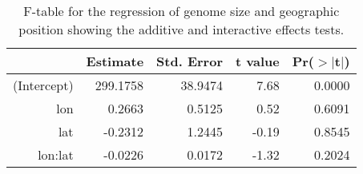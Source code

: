 \begin{table}[ht]
\centering
\begin{tabular}{rrrrr}
  \hline
 & Estimate & Std. Error & t value & Pr($>$$|$t$|$) \\ 
  \hline
(Intercept) & 299.1758 & 38.9474 & 7.68 & 0.0000 \\ 
  lon & 0.2663 & 0.5125 & 0.52 & 0.6091 \\ 
  lat & -0.2312 & 1.2445 & -0.19 & 0.8545 \\ 
  lon:lat & -0.0226 & 0.0172 & -1.32 & 0.2024 \\ 
   \hline
\end{tabular}
\caption{F-table for the regression of genome size and geographic position showing the additive and interactive effects tests.} 
\label{tab:sizegeo}
\end{table}
